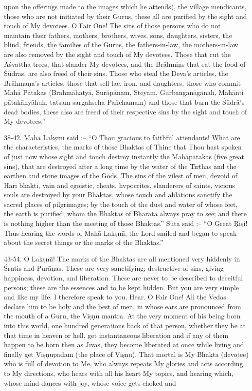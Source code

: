 upon the offerings made to the images which he attends), the village mendicants, those who are not initiated by their Gurus, these all are purified by the sight and touch of My devotees. O Fair One! The sins of those persons who do not maintain their fathers, mothers, brothers, wives, sons, daughters, sisters, the blind, friends, the families of the Gurus, the fathers-in-law, the mothers-in-law are also removed by the sight and touch of My devotees. Those that cut the A\'svattha trees, that slander My devotees, and the Br\=ahmi\d{n}s that eat the food of \'S\=udras, are also freed of their sins. Those who steal the Deva's articles, the Br\=ahma\d{n}a's articles, those that sell lac, iron, and daughters, those who commit Mah\=a P\=atakas (Brahm\=ahaty\=a, Sur\=ap\=anam, Steyam, Gurbangan\=aganah, Mah\=anti p\=atak\=any\=ahuh, tatsam-sargahseha Pa\~nchamam) and those that burn the \'S\=udr\=a's dead bodies, these also are freed of their respective sins by the sight and touch of My devotees.''

38-42. Mah\=a Lak\d{s}m\={\i} said :-- ``O Thou gracious to faithful attendants! What are the characteristics, the marks of those Bhaktas of Thine that Thou hast spoken of just now whose sight and touch destroy instantly the Mah\=ap\=atakas (five great sins), that are destroyed after a long time by the water of the T\={\i}rthas and the earthen and stone images of the Gods. The sins of the vilest of men, devoid of Hari bhakti, vain and egoistic, cheats, hvpocrites, slanderers of saints, vicious souls are destroyed by your Bhaktas, whose touch and ablations sanctify the sacred places of pilgrimages; by the touch of the dust and water of whose feet, the earth is purified; whom the Bhaktas of Bh\=arata always pray to see; and there is nothing higher than the meeting of those Bhaktas.'' S\=uta said :-- ``O Great \d{R}i\d{s}i! Thus hearing the words of Mah\=a Lak\d{s}m\={\i}, the Lord smiled and began to speak about the secret things or the marks of the Bhaktas.''

43-54. O Lak\d{s}m\={\i}! The marks of the Bhaktas are all mentioned very hiddenly in \'Srutis and Pur\=a\d{n}as. These are very sanctifying; destructive of sins, giving happiness, devotion, and liberation. These are never to be described to deceitful persons; these are the essences and to be kept hidden. But you are very simple and like my life. I therefore speak to you. Hear. O Fair One! All the Vedas declare him to be holy and the best of men, in whose ears are pronounced from the mouth of a Guru, the Vi\d{s}\d{n}u mantra. At the very moment of his being born into this world, one hundred generations back of that person, whether they be at that time in heaven or hell, get instantaneous liberation and if any of them happen to be born then as J\={\i}vas, they become liberated at once while living and finally get Vi\d{s}\d{n}upadam (the place of Vi\d{s}\d{n}u). That mortal is My Bhakta (devotee) who is full of devotion to Me, who always repeats My glories and acts according to My directions, who hears with all his heart My topics, and hearing which, whose mind dances with joy, whose voice gets choked and

